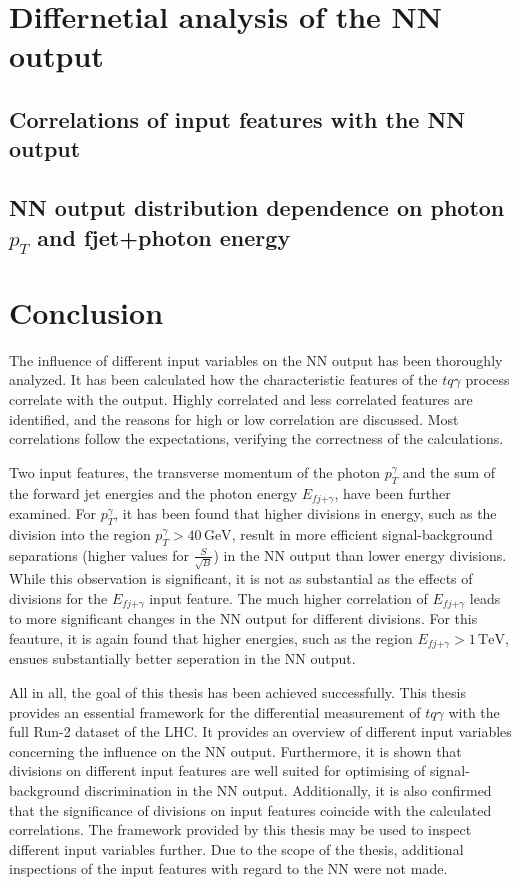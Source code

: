 \chapter{Differnetial analysis of the NN output}
\section{Correlations of input features with the NN output}
\section{NN output distribution dependence on photon \texorpdfstring{$p_T$}{pT} and fjet+photon energy}
\chapter{Conclusion}
The influence of different input variables on the NN output has been thoroughly analyzed. It has been calculated how the characteristic features of the $tq\gamma$ process 
correlate with the output. Highly correlated and less correlated features are identified, and the reasons for high or low correlation are discussed. 
Most correlations follow the expectations, verifying the correctness of the calculations.

Two input features, the transverse momentum of the photon $p_T^\gamma$ and the sum of the forward jet energies and the photon energy $E_{fj\text{+}\gamma}$, have been further examined. 
For $p_T^\gamma$, it has been found that higher divisions in energy, such as the division into the region $p_T^\gamma > 40 \,\si{\giga\electronvolt}$, result in more efficient signal-background separations (higher values for $\frac{S}{\sqrt{B}}$) in the NN output than lower energy divisions. 
While this observation is significant, it is not as substantial as the effects of divisions for the $E_{fj\text{+}\gamma}$ input feature. The much higher correlation of $E_{fj\text{+}\gamma}$ leads to more significant changes in the NN output for different divisions. 
For this feauture, it is again found that higher energies, such as the region $E_{fj\text{+}\gamma} > 1 \,\si{\tera\electronvolt}$, ensues substantially better seperation in the NN output. 

All in all, the goal of this thesis has been achieved successfully. This thesis provides an essential framework for the differential measurement of $tq\gamma$ with the full Run-2 dataset of the LHC. It provides an overview of different input variables concerning the influence on the NN output. 
Furthermore, it is shown that divisions on different input features are well suited for optimising of signal-background discrimination in the NN output. Additionally, it is also confirmed that the significance of divisions on input features coincide with the calculated correlations. 
The framework provided by this thesis may be used to inspect different input variables further. Due to the scope of the thesis, additional inspections of the input features with regard to the NN were not made.